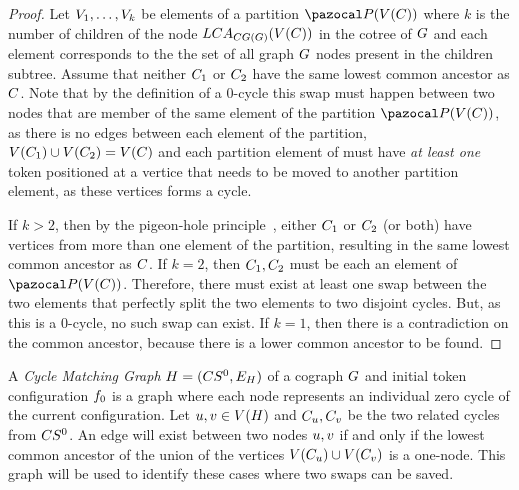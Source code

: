\documentclass[msc]{ppgccufmg}    %
\begin{document}
\begin{proof}
Let $V_{1}, \ldots, V_{k}$ be elements of a partition 
$\partitionFunc{\vertexFunc{\cycle}}$ where $k$ is the number of children 
of the node $LCA_{CG(G)}(V(C))$
in the cotree of $G$ and each element corresponds to the the set of
all graph $G$ nodes present in the children subtree.
Assume that neither $C_{1}$ or $C_{2}$ have the same lowest common
ancestor as $C$.
Note that by the definition of a 0-cycle this swap must happen between two
nodes that are member of the same element of the partition $\partitionFunc
{\vertexFunc{\cycle}}$, as there is no edges between each element of the 
partition, $V(C_{1}) \cup V(C_{2}) = 
V(C)$ and each partition element of must have \textit{at least 
one} token positioned at a vertice that needs to be moved to another partition 
element, as these vertices forms a cycle.

If $k > 2$, then by the pigeon-hole principle~\citep{Erdos:1987,Razborov:2002}, 
either $C_{1}$ or $C_{2}$ (or both) have vertices from more than 
one element of the partition, resulting in the same lowest common ancestor 
as $C$.
If $k = 2$, then $C_{1},C_{2}$ must be each an element of 
$\partitionFunc{\vertexFunc{\cycle}}$.
Therefore, there must exist at least one swap between the two elements that
perfectly split the two elements to two disjoint cycles.
But, as this is a 0-cycle, no such swap can exist.
If $k = 1$, then there is a contradiction on the common ancestor, because
there is a lower common ancestor to be found.
\end{proof}

A \textit{Cycle Matching Graph} $H = (CS^{0}, 
E_{H})$ of a cograph $G$ and initial token 
configuration $f_{0}$ is a graph where each node represents an individual zero
cycle of the current configuration. 
Let $u, v \in V(H)$ and $C_{u}, 
C_{v}$ be the two related cycles from $CS^{0}$.
An edge will exist between two nodes $u,v$ if and only if the lowest 
common ancestor of the union of the vertices $V(C_{u}) \cup
V(C_{v})$ is a one-node.
This graph will be used to identify these cases where two swaps can be saved.
\end{document}
